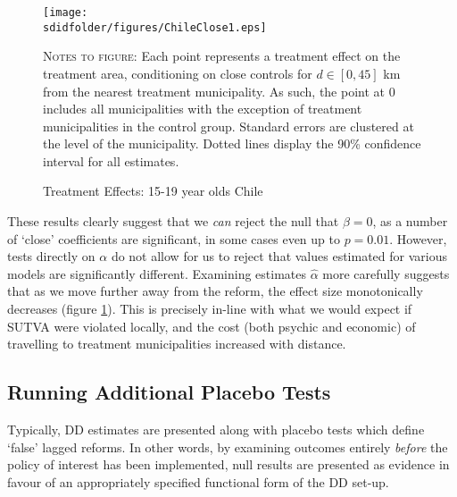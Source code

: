 \begin{figure}[h!]
\texttt{[image: \\sdidfolder/figures/ChileClose1.eps]}
\caption{Treatment Effects: 15-19 year olds Chile}
\label{Sfig:ChileAlpha}
\vspace{2mm}
\begin{footnotesize}
\textsc{Notes to figure}: Each point represents a treatment effect on the treatment
area, conditioning on close controls for $d\in [0,45]$ km from the nearest treatment 
municipality.  As such, the point at 0 includes all municipalities with the exception
of treatment municipalities in the control group.  Standard errors are clustered at 
the level of the municipality.  Dotted lines display the 90\% confidence interval for 
all estimates.
\end{footnotesize}
\end{figure}

These results clearly suggest that we \emph{can} reject the null that $\beta=0$, as
a number of `close' coefficients are significant, in some cases even up to $p=0.01$.
However, tests directly on $\alpha$ do not allow for us to reject that values 
estimated for various models are significantly different.  Examining estimates 
$\hat\alpha$ more carefully suggests that as we move further away from the reform,
the effect size monotonically decreases (figure \ref{Sfig:ChileAlpha}).  This is
precisely in-line with what we would expect if SUTVA were violated locally, and
the cost (both psychic and economic) of travelling to treatment municipalities
increased with distance.

\subsection{Running Additional Placebo Tests}
Typically, DD estimates are presented along with placebo tests which define `false'
lagged reforms.  In other words, by examining outcomes entirely \emph{before} the
policy of interest has been implemented, null results are presented as evidence
in favour of an appropriately specified functional form of the DD set-up.

